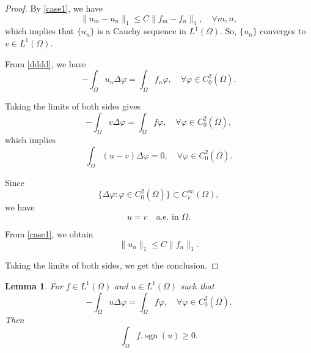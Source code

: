 \documentclass[a4paper, 11pt]{report}
\newtheorem{lmm}{Lemma}[chapter]
\theoremstyle{definition}\newtheorem*{rmk}{Remark}
\DeclareMathOperator{\sgn}{sgn}
\begin{document}
\begin{proof}
By \eqref{case1}, we have
\[
\| u_m - u_n \|_1 \le C \| f_m - f_n \|_1 ,\quad \forall m, n,
\]
which implies that $\{u_n\}$ is a Cauchy sequence in $L^1(\Omega)$. So, $\{ u_n\}$ converges to $v \in L^1(\Omega)$.

From \eqref{dddd}, we have
\[
-\int_{\Omega} u_n\Delta \varphi = \int_{\Omega} f_n \varphi, \quad \forall \varphi \in C^2_0(\overline{\Omega}).
\]

Taking the limits of both sides gives
\[
-\int_{\Omega} v\Delta \varphi = \int_{\Omega} f \varphi, \quad \forall \varphi \in C^2_0(\overline{\Omega}),
\]
which implies
\[
\int_{\Omega} (u-v)\Delta \varphi = 0, \quad \forall \varphi \in C^2_0(\overline{\Omega}).
\]

Since
\[
\{ \Delta \varphi: \varphi \in C_0^2(\overline{\Omega})\} \subset C_c^{\infty}(\Omega),
\]
we have
\[
u = v\quad \text{a.e.\ in } \Omega .
\]

From \eqref{case1}, we obtain
\[
\| u_n\|_1 \le C\| f_n\|_1.
\]

Taking the limits of both sides, we get the conclusion.
\end{proof}

\begin{lmm}\label{L1e3lmm}
For $f \in L^1(\Omega)$ and $u\in L^1(\Omega)$ such that
\[
-\int_{\Omega} u\Delta \varphi = \int_{\Omega} f \varphi, \quad \forall \varphi \in C^2_0(\overline{\Omega}).
\]
Then
\[
\int_{\Omega} f.\sgn(u) \ge 0 .
\]
\end{lmm}
\end{document}
